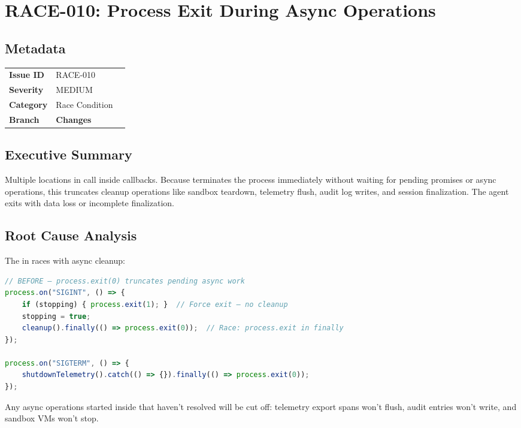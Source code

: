 \section{RACE-010: Process Exit During Async Operations}
\label{sec:race-010}
\subsection*{Metadata}
\begin{tabular}{ll}
\textbf{Issue ID} & RACE-010 \\
\textbf{Severity} & MEDIUM \\
\textbf{Category} & Race Condition \\
\textbf{Branch} & 
\textbf{Changes} &  \\
\end{tabular}

\subsection*{Executive Summary}
Multiple locations in  call  inside  callbacks. Because  terminates the process immediately without waiting for pending promises or async operations, this truncates cleanup operations like sandbox teardown, telemetry flush, audit log writes, and session finalization. The agent exits with data loss or incomplete finalization.

\subsection*{Root Cause Analysis}
The  in  races with async cleanup:

\begin{lstlisting}[language=TypeScript]
// BEFORE — process.exit(0) truncates pending async work
process.on("SIGINT", () => {
    if (stopping) { process.exit(1); }  // Force exit — no cleanup
    stopping = true;
    cleanup().finally(() => process.exit(0));  // Race: process.exit in finally
});

process.on("SIGTERM", () => {
    shutdownTelemetry().catch(() => {}).finally(() => process.exit(0));
});
\end{lstlisting}

Any async operations started inside  that haven't resolved will be cut off: telemetry export spans won't flush, audit entries won't write, and sandbox VMs won't stop.

